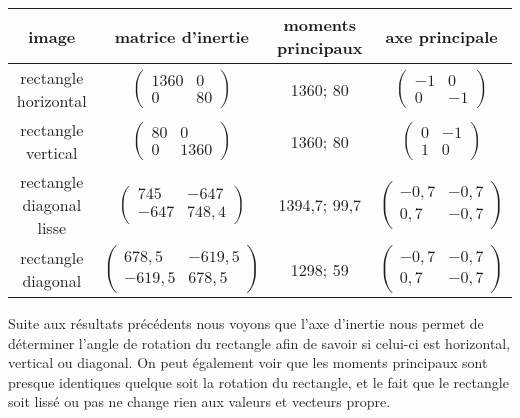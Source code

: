 \documentclass{article}
\begin{document}
  \begin{center}
    \begin{tabular}{|c|c|c|c|}
      \hline
      \textbf{image} & \textbf{matrice d'inertie} & \textbf{moments principaux} & \textbf{axe principale} \\
      \hline
      rectangle horizontal & $\begin{pmatrix}
			      1360 & 0 \\
			      0 & 80 
			      \end{pmatrix}$ 
			  & 1360; 80
			  &  $\begin{pmatrix}
			      -1 & 0 \\
			      0 & -1 
			      \end{pmatrix}$\\
      \hline
      rectangle vertical & $\begin{pmatrix}
			      80 & 0 \\
			      0 & 1360 
			      \end{pmatrix}$
			  & 1360; 80
			  &  $\begin{pmatrix}
			      0 & -1 \\
			      1 & 0 
			      \end{pmatrix}$\\
      \hline
      rectangle diagonal lisse & $\begin{pmatrix}
			      745 & -647 \\
			      -647 & 748,4 
			      \end{pmatrix}$
			  & 1394,7; 99,7
			  &  $\begin{pmatrix}
			      -0,7 & -0,7 \\
			      0,7 & -0,7 
			      \end{pmatrix}$\\
      \hline
      rectangle diagonal & $\begin{pmatrix}
			      678,5 & -619,5 \\
			      -619,5 & 678,5 
			      \end{pmatrix}$
			  & 1298; 59
			  &  $\begin{pmatrix}
			      -0,7 & -0,7 \\
			      0,7 & -0,7 
			      \end{pmatrix}$\\
      \hline
    \end{tabular}
  \end{center}
  
  Suite aux résultats précédents nous voyons que l'axe d'inertie nous permet de déterminer 
  l'angle de rotation du rectangle afin de savoir si celui-ci est horizontal, vertical ou diagonal. 
  On peut également voir que les moments principaux sont presque identiques quelque soit la rotation 
  du rectangle, et le fait que le rectangle soit lissé ou pas ne change rien aux valeurs et vecteurs 
  propre.\\
  
\end{document}
